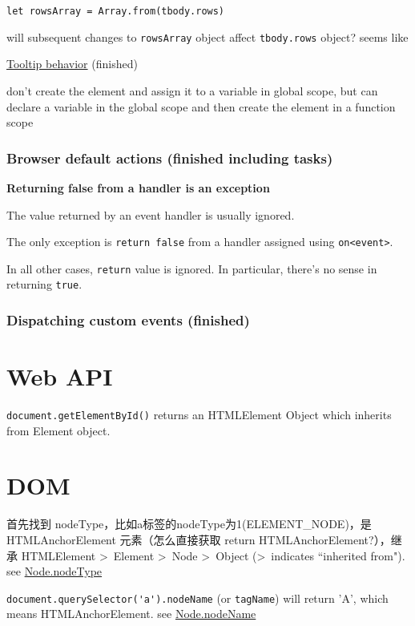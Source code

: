 \documentclass[a4paper, 12pt]{article}
\begin{document}
\verb|let rowsArray = Array.from(tbody.rows)|

will subsequent changes to \verb|rowsArray| object affect \verb|tbody.rows| object? seems like

\href{https://javascript.info/event-delegation#tooltip-behavior}{Tooltip behavior} (finished)

don't create the element and assign it to a variable in global scope, but can declare a variable in the global scope and then create the element in a function scope

\subsubsection{Browser default actions (finished including tasks)}
\textbf{Returning false from a handler is an exception}

The value returned by an event handler is usually ignored.

The only exception is \verb|return false| from a handler assigned using \verb|on<event>|.

In all other cases, \verb|return| value is ignored. In particular, there's no sense in returning \verb|true|.

\subsubsection{Dispatching custom events (finished)}



\section{Web API}
\verb|document.getElementById()| returns an HTMLElement Object which inherits from Element object.


\section{DOM}
首先找到 nodeType，比如a标签的nodeType为1(ELEMENT\_NODE)，是 HTMLAnchorElement 元素（怎么直接获取 return HTMLAnchorElement?），继承 HTMLElement \textgreater\ Element \textgreater\ Node \textgreater\ Object (\textgreater\ indicates ``inherited from").\\ see \href{https://developer.mozilla.org/en-US/docs/Web/API/Node/nodeType}{Node.nodeType}

{\color{red}\verb|document.querySelector('a').nodeName| (or \verb|tagName|)} will return 'A', which means HTMLAnchorElement. see \href{https://developer.mozilla.org/en-US/docs/Web/API/Node/nodeName}{Node.nodeName}
\end{document}
